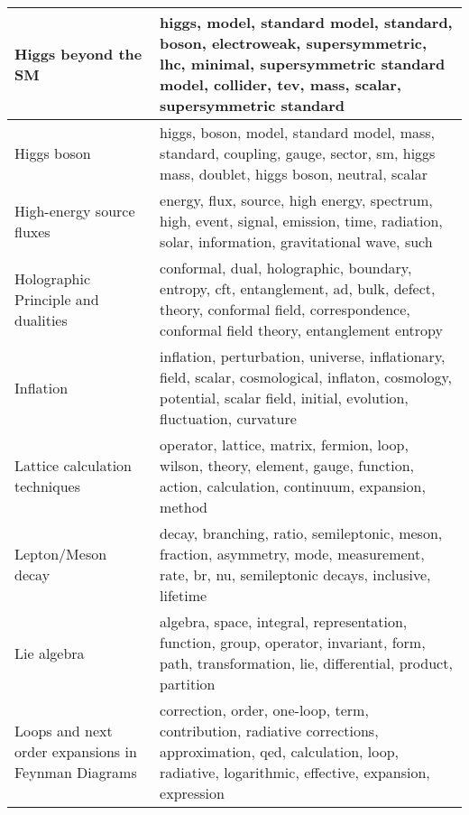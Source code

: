 \begin{longtable}[H]{p{}|p{}}
Higgs beyond the SM                                 &                              higgs, model, standard model, standard, boson, electroweak, supersymmetric, lhc, minimal, supersymmetric standard model, collider, tev, mass, scalar, supersymmetric standard \\ \midrule
Higgs boson                                         &                                                                        higgs, boson, model, standard model, mass, standard, coupling, gauge, sector, sm, higgs mass, doublet, higgs boson, neutral, scalar \\ \midrule
High-energy source fluxes                           &                                                                  energy, flux, source, high energy, spectrum, high, event, signal, emission, time, radiation, solar, information, gravitational wave, such \\ \midrule
Holographic Principle and dualities                 &                                conformal, dual, holographic, boundary, entropy, cft, entanglement, ad, bulk, defect, theory, conformal field, correspondence, conformal field theory, entanglement entropy \\ \midrule
Inflation                                           &                                     inflation, perturbation, universe, inflationary, field, scalar, cosmological, inflaton, cosmology, potential, scalar field, initial, evolution, fluctuation, curvature \\ \midrule
Lattice calculation techniques                      &                                                                      operator, lattice, matrix, fermion, loop, wilson, theory, element, gauge, function, action, calculation, continuum, expansion, method \\ \midrule
Lepton/Meson decay                                  &                                                               decay, branching, ratio, semileptonic, meson, fraction, asymmetry, mode, measurement, rate, br, nu, semileptonic decays, inclusive, lifetime \\ \midrule
Lie algebra                                         &                                                          algebra, space, integral, representation, function, group, operator, invariant, form, path, transformation, lie, differential, product, partition \\ \midrule
Loops and next order expansions in Feynman Diagrams &                                    correction, order, one-loop, term, contribution, radiative corrections, approximation, qed, calculation, loop, radiative, logarithmic, effective, expansion, expression \\ \midrule

\end{longtable}
